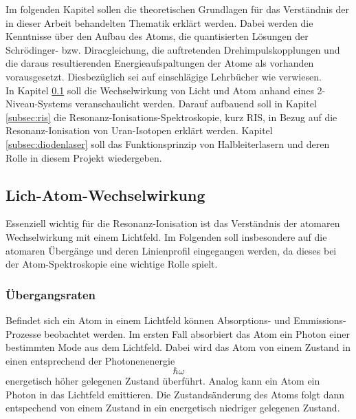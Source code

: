 Im folgenden Kapitel sollen die theoretischen Grundlagen für das Verständnis der
in dieser Arbeit behandelten Thematik erklärt werden. Dabei werden die
Kenntnisse über den Aufbau des Atoms, die quantisierten Lösungen der
Schrödinger- bzw. Diracgleichung, die auftretenden Drehimpulskopplungen und die
daraus resultierenden Energieaufspaltungen der Atome als vorhanden
vorausgesetzt. Diesbezüglich sei auf einschlägige Lehrbücher wie
\cite{demtroeder:ex3} verwiesen.\\
In Kapitel \ref{subsec:licht-atom-wechselwirkung} soll die Wechselwirkung von
Licht und Atom anhand eines 2-Niveau-Systems veranschaulicht werden. Darauf aufbauend soll
in Kapitel \ref{subsec:ris} die Resonanz-Ionisations-Spektroskopie,
kurz RIS, in Bezug auf die Resonanz-Ionisation von Uran-Isotopen erklärt
werden. Kapitel \ref{subsec:diodenlaser} soll das Funktionsprinzip von
Halbleiterlasern und deren Rolle in diesem Projekt wiedergeben.

\subsection{Lich-Atom-Wechselwirkung}\label{subsec:licht-atom-wechselwirkung}

Essenziell wichtig für die Resonanz-Ionisation ist das Verständnis der atomaren
Wechselwirkung mit einem Lichtfeld. Im Folgenden soll insbesondere auf die
atomaren Übergänge und deren Linienprofil eingegangen werden, da dieses bei der
Atom-Spektroskopie eine wichtige Rolle spielt.




\subsubsection{Übergangsraten}\label{subsec:uebergangsraten}
Befindet sich ein Atom in einem Lichtfeld können Absorptions- und
Emmissions-Prozesse beobachtet werden. Im ersten Fall absorbiert das Atom ein
Photon einer bestimmten Mode aus dem Lichtfeld. Dabei wird das Atom von einem
Zustand in einen entsprechend der Photonenenergie $$\hbar\omega$$ energetisch
höher gelegenen Zustand überführt. Analog kann ein Atom ein Photon in das Lichtfeld
emittieren. Die Zustandsänderung des Atoms folgt dann entspechend von einem
Zustand in ein energetisch niedriger gelegenen Zustand.\\


